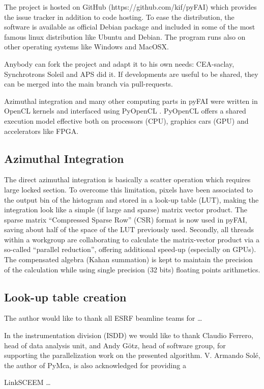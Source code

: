 \documentclass[preprint]{iucr}
\begin{document}
The project is hosted on GitHub (https://github.com/kif/pyFAI) which provides
the issue tracker in addition to code hosting. 
To ease the distribution, the
software is available as official Debian package and included in some of the
most famous linux distribution like Ubuntu and Debian. 
The program runs also on other operating systems like Windows and MacOSX. 

Anybody can fork the project and adapt it to his own needs: CEA-saclay,
Synchrotrons Soleil and APS did it. If developments are useful to be shared,
they can be merged into the main branch via pull-requests.

Azimuthal integration and many other computing parts in pyFAI were written in
OpenCL kernels and interfaced using PyOpenCL \cite{pyopencl}. PyOpenCL offers a
shared execution model effective both on processors (CPU), graphics cars (GPU)
and accelerators like FPGA.

\subsection{Azimuthal Integration}
The direct azimuthal integration is basically a scatter operation which 
requires large locked section. 
To overcome this limitation, pixels have been
associated to the output bin of the histogram and stored in a look-up
table (LUT), making the integration look like a simple (if large and sparse)
matrix vector product.
The sparse matrix ``Compressed Sparse Row'' (CSR) format is now used in pyFAI,
saving about half of the space of the LUT previously used.
Secondly, all threads within a workgroup are collaborating to calculate the
matrix-vector product via a so-called ``parallel reduction'', offering
additional speed-up (especially on GPUs).
The compensated algebra (Kahan summation) is kept to maintain the precision 
of the calculation while using single precision (32 bits) floating points
arithmetics.

\subsection{Look-up table creation}



The author would like to thank all ESRF beamline teams for \ldots 

In the instrumentation division (ISDD) we would like to thank Claudio Ferrero,
head of data analysis unit, and Andy G\"otz, head of software group, for
supporting the parallelization work on the presented algorithm.
V. Armando Solé, the author of PyMca, is also acknowledged for providing a

LinkSCEEM \ldots
\end{document}
